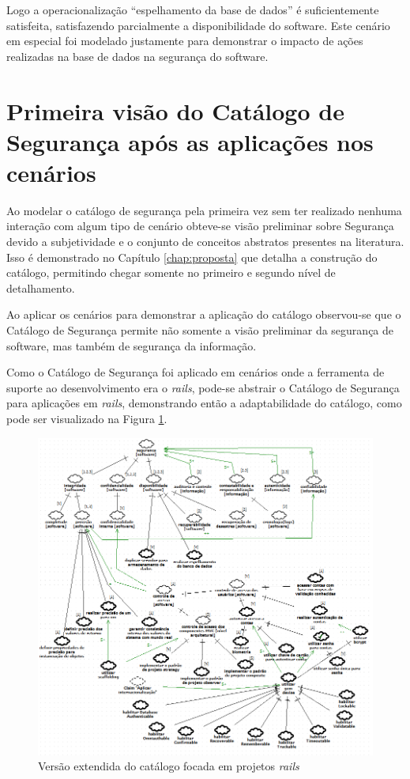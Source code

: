 Logo a operacionalização “espelhamento da base de dados” é suficientemente satisfeita, satisfazendo parcialmente a disponibilidade do software. Este cenário em especial foi modelado justamente para demonstrar o impacto de ações realizadas na base de dados na segurança do software.


\section{Primeira visão do Catálogo de Segurança após as aplicações nos cenários}
\label{sec: aplicacaoDoCatalogo}

Ao modelar o catálogo de segurança pela primeira vez sem ter realizado nenhuma interação com algum tipo de cenário obteve-se visão preliminar sobre Segurança devido a subjetividade e o conjunto de conceitos abstratos presentes na literatura. Isso é demonstrado no Capítulo \ref{chap:proposta} que detalha a construção do catálogo, permitindo chegar somente no primeiro e segundo nível de detalhamento. 

Ao aplicar os cenários para demonstrar a aplicação do catálogo observou-se que o Catálogo de Segurança permite não somente a visão preliminar da segurança de software, mas também de segurança da informação.

Como o Catálogo de Segurança foi aplicado em cenários onde a ferramenta de suporte ao desenvolvimento era o \textit{rails}, pode-se abstrair o Catálogo de Segurança para aplicações em \textit{rails}, demonstrando então a adaptabilidade do catálogo, como pode ser visualizado na Figura \ref{catalogoFull}.

\begin{figure}[h!]
	\centering
	\includegraphics[keepaspectratio=true,scale=0.7]{figuras/catalogoFull.PNG}
	\caption{Versão extendida do catálogo focada em projetos \textit{rails}}
	\label{catalogoFull}
\end{figure}

